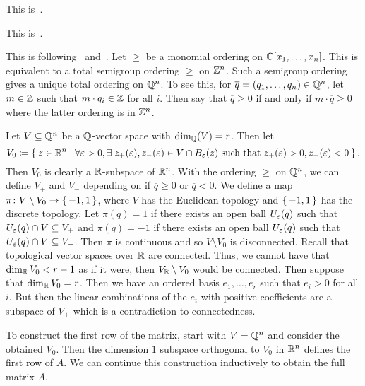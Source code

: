 \documentclass[letterpaper, 11pt, oneside]{book}
\begin{document}
\begin{sol}
  This is~\cite[Chapter 2, \S 7, Theorem 5]{book:IVA}.
\end{sol}

\begin{sol}
  This is~\cite[Chapter 3, \S 1, Theorem 2]{book:IVA}.
\end{sol}

\clearpage

\begin{sol}
  This is following~\cite{Robbiano_term_orders} and~\cite{book:Singular_Introduction}.
  Let $\geq$ be a monomial ordering on $\mathbb{C}[x_{1}, \ldots, x_{n}]$.
  This is equivalent to a total semigroup ordering $\geq$ on $\mathbb{Z}^{n}$.
  Such a semigroup ordering gives a unique total ordering on $\mathbb{Q}^{n}$.
  To see this, for $\overline{q} = (q_{1}, \ldots, q_{n}) \in \mathbb{Q}^{n}$, let $m \in \mathbb{Z}$ such that $m \cdot q_{i} \in \mathbb{Z}$ for all $i$.
  Then say that $\overline{q} \geq 0$ if and only if $m \cdot \overline{q} \geq 0$ where the latter ordering is in $\mathbb{Z}^{n}$.

  Let $V \subseteq \mathbb{Q}^{n}$ be a $\mathbb{Q}$-vector space with $\dim_{\mathbb{Q}}(V) = r$.
  Then let
  \[
    V_{0} \coloneqq \Set{z \in \mathbb{R}^{n} | \forall \varepsilon> 0, \exists\; z_{+}(\varepsilon), z_{-}(\varepsilon) \in V \cap B_{\varepsilon}(z) \text{ such that } z_{+}(\varepsilon) > 0, z_{-}(\varepsilon) < 0}.
  \]
  Then $V_{0}$ is clearly a $\mathbb{R}$-subspace of $\mathbb{R}^{n}$.
  With the ordering $\geq$ on $\mathbb{Q}^{n}$, we can define $V_{+}$ and $V_{-}$ depending on if $\overline{q} \geq 0$ or $\overline{q} < 0$.
  We define a map $\pi\colon V \setminus V_{0} \to \set{-1, 1}$, where $V$ has the Euclidean topology and $\set{-1, 1}$ has the discrete topology.
  Let $\pi(q) = 1$ if there exists an open ball $U_{\varepsilon}(q)$ such that $U_{\varepsilon}(q) \cap V \subseteq V_{+}$ and $\pi(q) = -1$ if there exists an open ball $U_{\varepsilon}(q)$ such that $U_{\varepsilon}(q) \cap V \subseteq V_{-}$.
  Then $\pi$ is continuous and so $V \setminus V_{0}$ is disconnected.
  Recall that topological vector spaces over $\mathbb{R}$ are connected.
  Thus, we cannot have that $\dim_{\mathbb{R}} V_{0} < r - 1$ as if it were, then $V_{\mathbb{R}} \setminus V_{0}$ would be connected.
  Then suppose that $\dim_{\mathbb{R}} V_{0} = r$.
  Then we have an ordered basis $e_{1}, \ldots, e_{r}$ such that $e_{i} > 0$ for all $i$.
  But then the linear combinations of the $e_{i}$ with positive coefficients are a subspace of $V_{+}$ which is a contradiction to connectedness.

  To construct the first row of the matrix, start with $V = \mathbb{Q}^{n}$ and consider the obtained $V_{0}$.
  Then the dimension $1$ subspace orthogonal to $V_{0}$ in $\mathbb{R}^{n}$ defines the first row of $A$.
  We can continue this construction inductively to obtain the full matrix $A$.
\end{sol}
\end{document}
